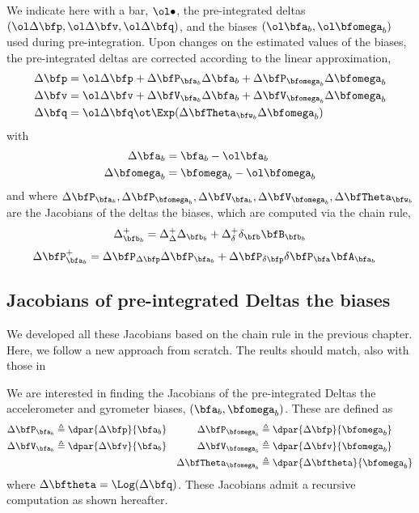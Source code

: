We indicate here with a bar, $\ol\bullet$, the pre-integrated deltas $(\ol\Dp,\ol\Dv,\ol\Dq)$, and the biases $(\ol\ab,\ol\wb)$ used during pre-integration.
%
Upon changes on the estimated values of the biases, the pre-integrated deltas are corrected according to the linear approximation,
%
\begin{align}
\begin{split}
\Dp &= \ol\Dp + \DP_{\ab}\D\ab  + \DP_{\wb}\D\wb  \\ 
\Dv &= \ol\Dv + \DV_{\ab}\D\ab  + \DV_{\wb}\D\wb  \\
\Dq &= \ol\Dq\ot\Exp(\DTH_{\bfw_b}\D\wb)
\end{split}
\end{align}
%
with 
%
\begin{align}
\begin{split}
\D\ab &= \ab - \ol\ab \\
\D\wb &= \wb - \ol\wb 
\end{split}
\end{align}
%
and where $\DP_{\ab},\DP_{\wb},\DV_{\ab},\DV_{\wb},\DTH_{\bfw_b}$ are the Jacobians of the deltas \wrt the biases, which are computed via the chain rule,
%
\begin{align}
\D^+_{\bfb_b} = \D^+_\D\D_{\bfb_b}+\D^+_\delta\delta_\bfb\bfB_{\bfb_b}
\end{align}
%
\begin{align}
\DP^+_{\bfa_b} &= \DP_\Dp\DP_{\bfa_b} + \DP_\dpp\dP_\bfa\bfA_{\bfa_b}
\end{align}


\subsection{Jacobians of pre-integrated Deltas \wrt the biases}

We developed all these Jacobians based on the chain rule in the previous chapter. Here, we follow a new approach from scratch. The reults should match, also with those in \cite{FORSTER-16-techrep}


We are interested in finding the Jacobians of the pre-integrated Deltas \wrt the accelerometer and gyrometer biases, $(\ab,\wb)$. These are defined as
%
\begin{align*}
\DP_{\ab} &\te \dpar{\Dp}{\ab} & \DP_{\wb} &\te \dpar{\Dp}{\wb} \\
\DV_{\ab} &\te \dpar{\Dv}{\ab} & \DV_{\wb} &\te \dpar{\Dv}{\wb} \\
&& \DTH_{\wb} &\te \dpar{\Dth}{\wb} 
\end{align*}
%
where $\Dth = \Log(\Dq)$. These Jacobians admit a recursive computation as shown hereafter.


